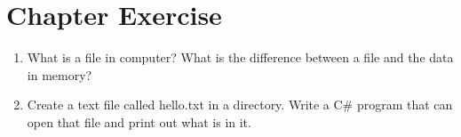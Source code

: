 \documentclass[../main.tex]{subfiles}
\begin{document}
    \section{Chapter Exercise}
    \begin{enumerate}
        \item What is a file in computer? What is the difference between a file
        and the data in memory?
        \item Create a text file called hello.txt in a directory. Write a C\#
        program that can open that file and print out what is in it.
    \end{enumerate}
\end{document}

